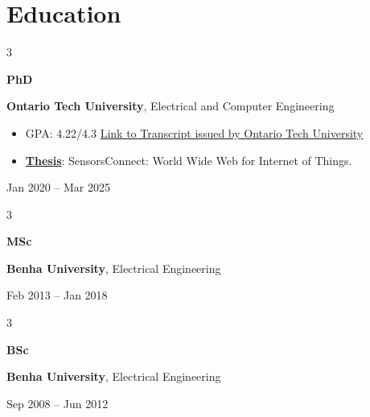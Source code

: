 \documentclass[10pt, letterpaper]{article}
\newenvironment{highlights}{
    \begin{itemize}[
        topsep=0.10 cm,
        parsep=0.10 cm,
        partopsep=0pt,
        itemsep=0pt,
        leftmargin=0.4 cm + 10pt
    ]
}{
    \end{itemize}
} %
\newenvironment{threecolentry}[3][]{
    \onecolentry
    \def\thirdColumn{#3}
    \setcolumnwidth{1.2 cm, \fill, 4.5 cm}
    \begin{paracol}{3}
    {\raggedright #2} \switchcolumn
}{
    \switchcolumn \raggedleft \thirdColumn
    \end{paracol}
    \endonecolentry
} %
\let\hrefWithoutArrow\href
\renewcommand{\href}[2]{\hrefWithoutArrow{#1}{#2}}
\begin{document}

  

\vspace{-0.3cm}
    \section{Education}



        
        \begin{threecolentry}{\textbf{PhD}}{
            Jan 2020 – Mar 2025
        }
            \textbf{Ontario Tech University}, Electrical and Computer Engineering
            \begin{highlights}
                \item GPA: 4.22/4.3 \href{https://learner.mycreds.ca/sharelink/f677e6e2-700e-4b53-a439-30bacbe9bde9/56c2684a-c6e8-480c-9fa4-93d6d649d3fe}{Link to Transcript issued by Ontario Tech University}
                \item \textbf{\href{https://ontariotechu.scholaris.ca/items/ae8fb02b-3cff-4738-aa4b-96834b35dc54/full}{Thesis}}: SensorsConnect: World Wide Web for Internet of Things.
            \end{highlights}
        \end{threecolentry}

\begin{threecolentry}{\textbf{MSc}}{
           Feb 2013 – Jan 2018
        }
            \textbf{Benha University}, Electrical Engineering
        \end{threecolentry}


\begin{threecolentry}{\textbf{BSc}}{
            Sep  2008 – Jun 2012
        }
             \textbf{Benha University}, Electrical Engineering

        \end{threecolentry}
\end{document}

